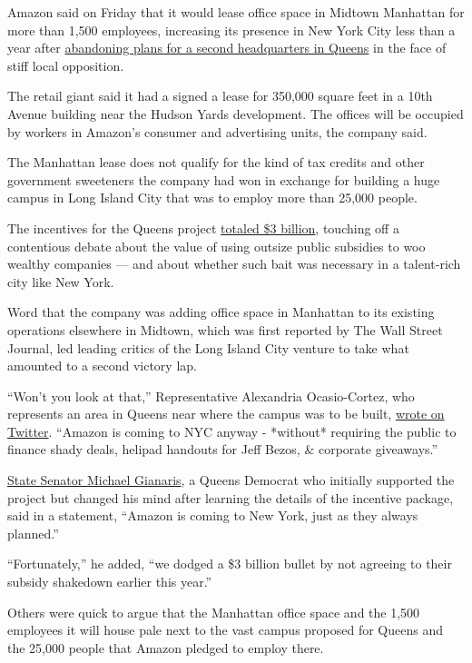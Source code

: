 Amazon said on Friday that it would lease office space in Midtown
Manhattan for more than 1,500 employees, increasing its presence in New
York City less than a year after
\href{https://www.nytimes3xbfgragh.onion/2019/02/14/nyregion/amazon-hq2-queens.html}{abandoning
plans for a second headquarters in Queens} in the face of stiff local
opposition.

The retail giant said it had a signed a lease for 350,000 square feet in
a 10th Avenue building near the Hudson Yards development. The offices
will be occupied by workers in Amazon's consumer and advertising units,
the company said.

The Manhattan lease does not qualify for the kind of tax credits and
other government sweeteners the company had won in exchange for building
a huge campus in Long Island City that was to employ more than 25,000
people.

The incentives for the Queens project
\href{https://www.nytimes3xbfgragh.onion/2019/02/14/upshot/amazon-foxconn-subsidies-critics.html}{totaled
\$3 billion}, touching off a contentious debate about the value of using
outsize public subsidies to woo wealthy companies --- and about whether
such bait was necessary in a talent-rich city like New York.

Word that the company was adding office space in Manhattan to its
existing operations elsewhere in Midtown, which was first reported by
The Wall Street Journal, led leading critics of the Long Island City
venture to take what amounted to a second victory lap.

``Won't you look at that,'' Representative Alexandria Ocasio-Cortez, who
represents an area in Queens near where the campus was to be built,
\href{https://twitter.com/AOC/status/1203083485252112384}{wrote on
Twitter}. ``Amazon is coming to NYC anyway - *without* requiring the
public to finance shady deals, helipad handouts for Jeff Bezos, \&
corporate giveaways.''

\href{https://www.nytimes3xbfgragh.onion/2019/02/04/nyregion/amazon-hq2-board-veto.html}{State
Senator Michael Gianaris}, a Queens Democrat who initially supported the
project but changed his mind after learning the details of the incentive
package, said in a statement, ``Amazon is coming to New York, just as
they always planned.''

``Fortunately,'' he added, ``we dodged a \$3 billion bullet by not
agreeing to their subsidy shakedown earlier this year.''

Others were quick to argue that the Manhattan office space and the 1,500
employees it will house pale next to the vast campus proposed for Queens
and the 25,000 people that Amazon pledged to employ there.

